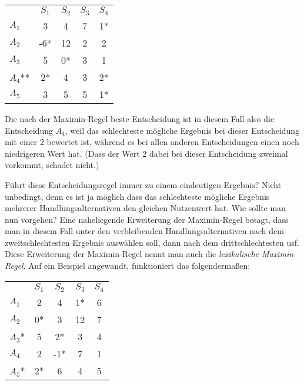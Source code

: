 \begin{center}
\begin{tabular}{l|c|c|c|c|}
\multicolumn{1}{c}{ } & \multicolumn{1}{c}{$S_1$} &
\multicolumn{1}{c}{$S_2$} & \multicolumn{1}{c}{$S_3$} & 
\multicolumn{1}{c}{$S_4$} \\ \cline{2-5}
$A_1$   &    3  &    4  &    7  &   1*  \\ \cline{2-5}
$A_2$   &   -6* &   12  &    2  &    2  \\ \cline{2-5}
$A_3$   &    5  &    0* &    3  &    1  \\ \cline{2-5}
$A_4$** &    2* &    4  &    3  &    2* \\ \cline{2-5}
$A_5$   &    3  &    5  &    5  &    1*  \\ \cline{2-5}
\end{tabular}
\end{center}

Die nach der Maximin-Regel beste Entscheidung ist in diesem Fall also die
Entscheidung $A_4$, weil das schlechteste mögliche Ergebnis bei dieser
Entscheidung mit einer 2 bewertet ist, während es bei allen anderen
Entscheidungen einen noch niedrigeren Wert hat. (Dass der Wert 2 dabei bei
dieser Entscheidung zweimal vorkommt, schadet nicht.)

Führt diese Entscheidungsregel immer zu einem eindeutigen Ergebnis? Nicht
unbedingt, denn es ist ja möglich dass das schlechteste mögliche Ergebnis
mehrerer Handlungsalternativen den gleichen Nutzenwert hat. Wie sollte man nun
vorgehen? Eine naheliegende Erweiterung der Maximin-Regel besagt, dass man in
diesem Fall unter den verbleibenden Handlungsalternativen nach dem
zweitschlechtesten Ergebnis auswählen soll, dann nach dem drittschlechtesten
usf.  
Diese Erweiterung der Maximin-Regel nennt man auch die {\em lexikalische
Maximin-Regel}. Auf ein Beispiel angewandt, funktioniert das folgendermaßen:

\begin{center}
\begin{tabular}{l|c|c|c|c|}
\multicolumn{1}{c}{ } & \multicolumn{1}{c}{$S_1$} &
\multicolumn{1}{c}{$S_2$} & \multicolumn{1}{c}{$S_3$} & 
\multicolumn{1}{c}{$S_4$} \\ \cline{2-5}
$A_1$   &    2  &    4  &    1* &   6   \\ \cline{2-5}
$A_2$   &    0* &    3  &    12 &   7   \\ \cline{2-5}
$A_3$*  &    5  &    2* &    3  &   4   \\ \cline{2-5}
$A_4$   &    2  &   -1* &    7  &   1   \\ \cline{2-5}
$A_5$*  &    2* &    6  &    4  &   5   \\ \cline{2-5}
\end{tabular}
\end{center}
 
